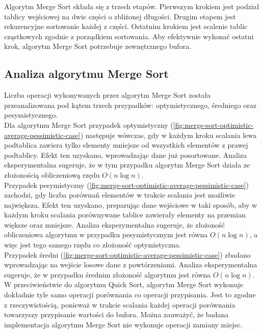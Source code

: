 Algorytm Merge Sort składa się z trzech etapów. Pierwszym krokiem jest podział tablicy wejściowej na dwie części o zbliżonej długości. Drugim etapem jest rekurencyjne sortowanie każdej z części. Ostatnim krokiem jest scalenie tablic cząstkowych zgodnie z porządkiem sortowania. Aby efektywnie wykonać ostatni krok, algorytm Merge Sort potrzebuje zewnętrznego bufora.\\

\subsection{Analiza algorytmu Merge Sort}
Liczba operacji wykonywanych przez algorytm Merge Sort została przeanalizowana pod kątem trzech przypadków:
optymistycznego, średniego oraz pesymistycznego.\\

Dla algorytmu Merge Sort przypadek optymistyczny (\ref{fig:merge-sort-optimistic-average-pessimistic-case}) następuje wówczas, gdy w każdym kroku scalania lewa podtablica zawiera tylko elementy mniejsze od wszystkich elementów z prawej podtablicy. Efekt ten uzyskano, wprowadzając dane już posortowane. Analiza eksperymentalna sugeruje, że w tym przypadku algorytm Merge Sort działa ze złożonością obliczeniową rzędu $O(n\log{}n)$.\\

Przypadek pesymistyczny (\ref{fig:merge-sort-optimistic-average-pessimistic-case}) zachodzi, gdy liczba porównań elementów w trakcie scalania jest możliwie największa. Efekt ten uzyskano, preparując dane wejściowe w taki sposób,
aby w każdym kroku scalania porównywane tablice zawierały elementy na przemian większe oraz mniejsze. Analiza eksperymentalna sugeruje, że złożoność obliczeniowa algorytmu w przypadku pesymistycznym jest równa $O(n\log{}n)$, a więc jest tego samego rzędu co złożoność optymistyczna.\\

Przypadek średni (\ref{fig:merge-sort-optimistic-average-pessimistic-case}) zbadano wprowadzając na wejście losowe dane z powtórzeniami. Analiza eksperymentalna sugeruje, że w przypadku średnim złożoność algorytmu jest równa $O(n\log{}n)$.\\

W przeciwieństwie do algorytmu Quick Sort, algorytm Merge Sort wykonuje dokładnie tyle samo operacji porównania co operacji przypisania. Jest to zgodne z rzeczywistością, ponieważ w trakcie scalania każdej operacji porównania towarzyszy przypisanie wartości do bufora. Można zauważyć, że badana implementacja algorytmu Merge Sort nie wykonuje operacji zamiany miejsc.\\

